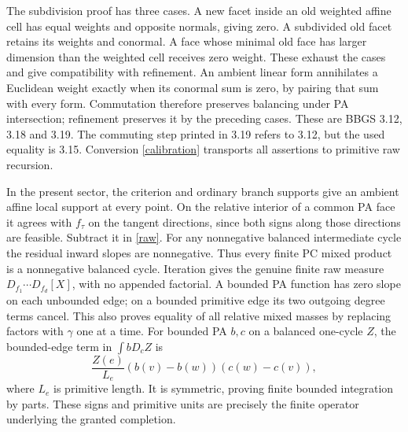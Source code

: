 \documentclass[11pt]{article}
\begin{document}
The subdivision proof has three cases. A new facet inside an old weighted affine cell has equal weights and opposite normals, giving zero. A subdivided old facet retains its weights and conormal. A face whose minimal old face has larger dimension than the weighted cell receives zero weight. These exhaust the cases and give compatibility with refinement. An ambient linear form annihilates a Euclidean weight exactly when its conormal sum is zero, by pairing that sum with every form. Commutation therefore preserves balancing under PA intersection; refinement preserves it by the preceding cases. These are BBGS 3.12, 3.18 and 3.19. The commuting step printed in 3.19 refers to 3.12, but the used equality is 3.15. Conversion \eqref{calibration} transports all assertions to primitive raw recursion.

In the present sector, the criterion and ordinary branch supports give an ambient affine local support at every point. On the relative interior of a common PA face it agrees with $f_\tau$ on the tangent directions, since both signs along those directions are feasible. Subtract it in \eqref{raw}. For any nonnegative balanced intermediate cycle the residual inward slopes are nonnegative. Thus every finite PC mixed product is a nonnegative balanced cycle. Iteration gives the genuine finite raw measure $D_{f_1}\cdots D_{f_d}[X]$, with no appended factorial. A bounded PA function has zero slope on each unbounded edge; on a bounded primitive edge its two outgoing degree terms cancel. This also proves equality of all relative mixed masses by replacing factors with $\gamma$ one at a time. For bounded PA $b,c$ on a balanced one-cycle $Z$, the bounded-edge term in $\int bD_cZ$ is
\[
 \frac{Z(e)}{L_e}(b(v)-b(w))(c(w)-c(v)),
\]
where $L_e$ is primitive length. It is symmetric, proving finite bounded integration by parts. These signs and primitive units are precisely the finite operator underlying the granted completion.
\end{document}
